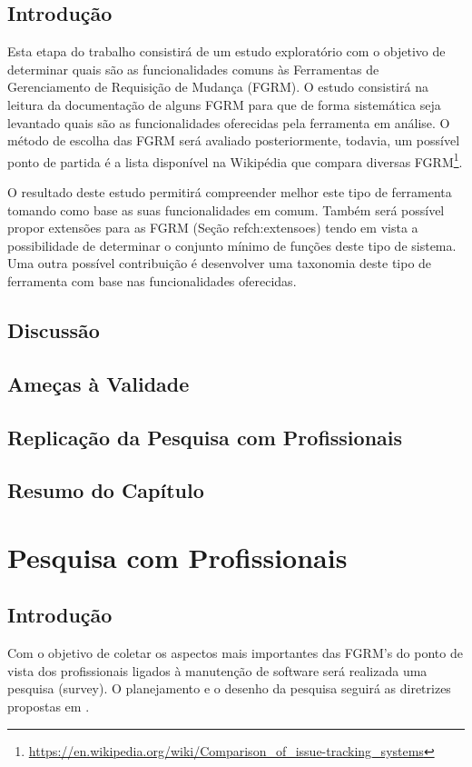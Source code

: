 \documentclass[msc]{ppgccufmg} %
\begin{document}
\section{Introdução}

Esta etapa do trabalho consistirá de um estudo exploratório com o objetivo de determinar quais são as funcionalidades comuns às Ferramentas de Gerenciamento de Requisição de Mudança (FGRM). O estudo consistirá na leitura da documentação de alguns FGRM para que de forma sistemática seja levantado quais são as funcionalidades oferecidas pela ferramenta em análise. O método de escolha das FGRM será avaliado posteriormente, todavia, um possível ponto de partida é a lista disponível na Wikipédia que compara diversas FGRM\footnote{\url{https://en.wikipedia.org/wiki/Comparison_of_issue-tracking_systems}}.

O resultado deste estudo permitirá compreender melhor este tipo de ferramenta tomando como base as suas funcionalidades em comum. Também será possível propor extensões para as FGRM (Seção ref{ch:extensoes}) tendo em vista a possibilidade de determinar o conjunto mínimo de funções deste tipo de sistema. Uma outra possível contribuição é desenvolver uma taxonomia deste tipo de ferramenta com base nas funcionalidades oferecidas.

\section{Discussão}

\section{Ameças à Validade}

\section{Replicação da Pesquisa com Profissionais}

\section{Resumo do Capítulo}


\chapter{Pesquisa com Profissionais}
\label{ch:pesquisa-profissionais}

\section{Introdução}
Com o objetivo de coletar os aspectos mais importantes das FGRM's do ponto de
vista dos profissionais ligados à manutenção de software será realizada uma
 pesquisa (survey). O planejamento e o desenho da pesquisa seguirá as diretrizes propostas em \cite{wohlin2012experimentation}.
\end{document}
